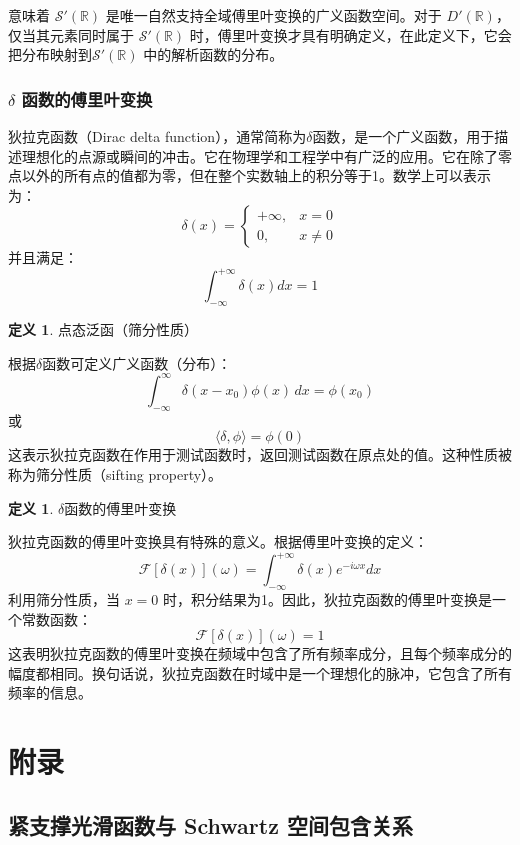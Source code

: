 \documentclass[12pt,a4paper]{article}
\theoremstyle{plain}
\theoremstyle{definition}
\newtheorem{definition}[theorem]{定义}
\theoremstyle{remark}
\begin{document}
意味着 $\mathcal{S}'(\mathbb{R})$ 是唯一自然支持全域傅里叶变换的广义函数空间。对于 $D'(\mathbb{R})$，仅当其元素同时属于 $\mathcal{S}'(\mathbb{R})$ 时，傅里叶变换才具有明确定义，在此定义下，它会把分布映射到$\mathcal{S}'(\mathbb{R})$ 中的解析函数的分布。

\subsubsection{$\delta$ 函数的傅里叶变换}
狄拉克函数（Dirac delta function），通常简称为$\delta$函数，是一个广义函数，用于描述理想化的点源或瞬间的冲击。它在物理学和工程学中有广泛的应用。它在除了零点以外的所有点的值都为零，但在整个实数轴上的积分等于1。数学上可以表示为：
\[
\delta(x) = \begin{cases} 
	+\infty, & x = 0 \\
	0, & x \ne 0 
\end{cases}
\]
并且满足：
\[
\int_{-\infty}^{+\infty} \delta(x) dx = 1
\]
\begin{definition}点态泛函（筛分性质）
	
	根据$\delta$函数可定义广义函数（分布）：
	\[
	\int_{-\infty}^{\infty} \delta(x - x_0) \phi(x) \, dx = \phi(x_0)
	\]
	或
	\[
	\langle \delta, \phi \rangle = \phi(0)
	\]
	这表示狄拉克函数在作用于测试函数时，返回测试函数在原点处的值。这种性质被称为筛分性质（sifting property）。
\end{definition}

\begin{definition}$\delta$函数的傅里叶变换
	
狄拉克函数的傅里叶变换具有特殊的意义。根据傅里叶变换的定义：
\[
\mathcal{F}[\delta(x)](\omega) = \int_{-\infty}^{+\infty} \delta(x) e^{-i\omega x} dx
\]
利用筛分性质，当 \(x = 0\) 时，积分结果为1。因此，狄拉克函数的傅里叶变换是一个常数函数：
\[
\mathcal{F}[\delta(x)](\omega) = 1
\]
这表明狄拉克函数的傅里叶变换在频域中包含了所有频率成分，且每个频率成分的幅度都相同。换句话说，狄拉克函数在时域中是一个理想化的脉冲，它包含了所有频率的信息。
\end{definition}

\newpage

\appendix
\section{附录}\label{app:first}

\subsection{紧支撑光滑函数与 Schwartz 空间包含关系}
\end{document}
